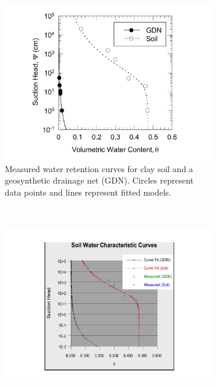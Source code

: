 \documentclass[11pt,letterpaper]{article}
\begin{document}
\vspace{0.5cm}
\begin{figure}
        \centering
        \begin{subfigure}[t]{0.4\textwidth}
                \includegraphics[width=\textwidth]{soil_good}
                \caption{Measured water retention curves for clay soil and a geosynthetic drainage net (GDN).  Circles represent data points and lines represent fitted models.}
                \label{fig:soilgood}
        \end{subfigure}%
        \hspace{1cm}
        ~ %
        \begin{subfigure}[t]{0.4\textwidth}
                \includegraphics[width=\textwidth]{soil_notsogood}
                \label{fig:soildnotsogood}
        \end{subfigure}
\end{figure}
\end{document}

